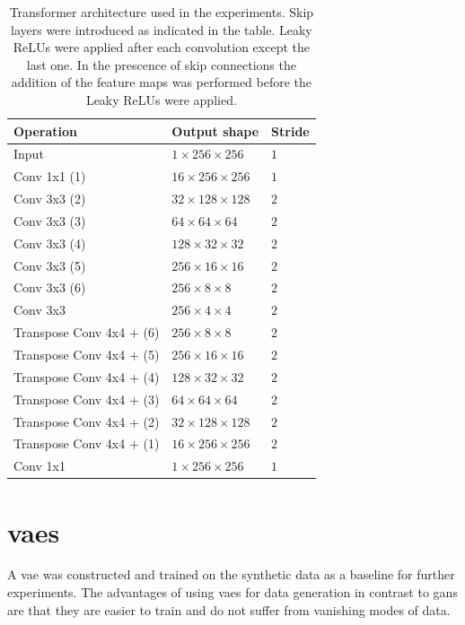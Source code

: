 \begin{table}[t]
    \centering
    \caption{Transformer architecture used in the experiments. Skip layers were introduced as indicated in the table. Leaky ReLUs were applied after each convolution except the last one. In the prescence of skip connections the addition of the feature maps was performed before the Leaky ReLUs were applied.}
    \label{tab:transformer}
    \begin{tabular}{|lll|}
        \hline
        Operation           & Output shape  & Stride \\ \hline
        Input               & $1\times256\times256$     &$1$    \\
        Conv 1x1 (1)           & $16\times256\times256$    &$1$    \\
        Conv 3x3 (2)            & $32\times128\times128$    &$2$    \\    
        Conv 3x3 (3)           & $64\times64\times64$    &$2$    \\ 
        Conv 3x3 (4)           & $128\times32\times32$    &$2$   \\ 
        Conv 3x3 (5)           & $256\times16\times16$    &$2$   \\ 
        Conv 3x3 (6)           & $256\times8\times8$     &$2$   \\ 
        Conv 3x3            & $256\times4\times4$    &$2$   \\ \hline
        Transpose Conv 4x4 + (6)  & $256\times8\times8$    &$2$   \\
        Transpose Conv 4x4 + (5) & $256\times16\times16$    &$2$   \\
        Transpose Conv 4x4 + (4) & $128\times32\times32$    &$2$   \\
        Transpose Conv 4x4 + (3) & $64\times64\times64$    &$2$   \\
        Transpose Conv 4x4 + (2) & $32\times128\times128$    &$2$   \\
        Transpose Conv 4x4 + (1)  & $16\times256\times256$    &$2$   \\
        Conv 1x1            & $1\times256\times256$    &$1$    \\ \hline
    \end{tabular}
\end{table}

\section{\acrlong{vaes}}
A \acrlong{vae} was constructed and trained on the synthetic data as a baseline for further experiments. The advantages of using \acrshort{vaes} for data generation in contrast to \acrshort{gans} are that they are easier to train and do not suffer from vanishing modes of data.

